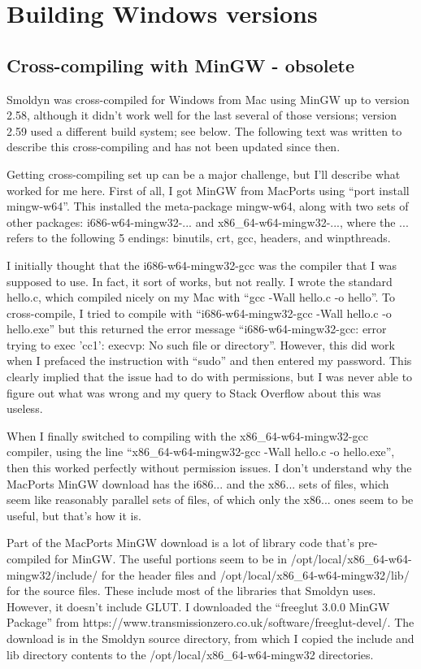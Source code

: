 \documentclass {book}
\begin{document}
\section{Building Windows versions}

\subsection{Cross-compiling with MinGW - obsolete}

Smoldyn was cross-compiled for Windows from Mac using MinGW up to version 2.58, although it didn't work well for the last several of those versions; version 2.59 used a different build system; see below. The following text was written to describe this cross-compiling and has not been updated since then.

Getting cross-compiling set up can be a major challenge, but I'll describe what worked for me here. First of all, I got MinGW from MacPorts using ``port install mingw-w64''. This installed the meta-package mingw-w64, along with two sets of other packages: i686-w64-mingw32-... and x86\_64-w64-mingw32-..., where the ... refers to the following 5 endings: binutils, crt, gcc, headers, and winpthreads.

I initially thought that the i686-w64-mingw32-gcc was the compiler that I was supposed to use. In fact, it sort of works, but not really. I wrote the standard hello.c, which compiled nicely on my Mac with ``gcc -Wall hello.c -o hello''. To cross-compile, I tried to compile with ``i686-w64-mingw32-gcc -Wall hello.c -o hello.exe'' but this returned the error message ``i686-w64-mingw32-gcc: error trying to exec 'cc1': execvp: No such file or directory''. However, this did work when I prefaced the instruction with ``sudo'' and then entered my password. This clearly implied that the issue had to do with permissions, but I was never able to figure out what was wrong and my query to Stack Overflow about this was useless.

When I finally switched to compiling with the x86\_64-w64-mingw32-gcc compiler, using the line ``x86\_64-w64-mingw32-gcc -Wall hello.c -o hello.exe'', then this worked perfectly without permission issues. I don't understand why the MacPorts MinGW download has the i686... and the x86... sets of files, which seem like reasonably parallel sets of files, of which only the x86... ones seem to be useful, but that's how it is.

Part of the MacPorts MinGW download is a lot of library code that's pre-compiled for MinGW. The useful portions seem to be in /opt/local/x86\_64-w64-mingw32/include/ for the header files and /opt/local/x86\_64-w64-mingw32/lib/ for the source files. These include most of the libraries that Smoldyn uses. However, it doesn't include GLUT. I downloaded the ``freeglut 3.0.0 MinGW Package'' from https://www.transmissionzero.co.uk/software/freeglut-devel/. The download is in the Smoldyn source directory, from which I copied the include and lib directory contents to the /opt/local/x86\_64-w64-mingw32 directories.
\end{document}
